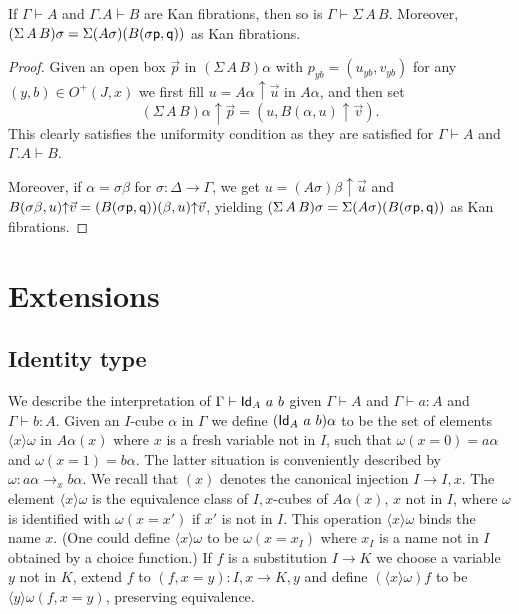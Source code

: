 \documentclass[10pt,a4paper]{article}
\newcommand{\Id}{{\sf Id}}
\newcommand{\pp}{{\sf p}}
\newcommand{\qq}{{\sf q}}
\newcommand{\rup}[1]{#1{\uparrow}}
\newcommand{\bind}[2]{{\langle}#1{\rangle}#2}
\begin{document}
\begin{theorem}
  If $\Gamma \vdash A$ and $\Gamma.A \vdash B$ are Kan fibrations,
  then so is $\Gamma \vdash \Sigma\,A\,B$.  Moreover, $(\Sigma\,A\,B)
  \sigma = \Sigma (A \sigma) (B (\sigma \pp, \qq))$ as Kan fibrations.
\end{theorem}
\begin{proof}
  Given an open box $\vec p$ in $(\Sigma\,A\,B) \alpha$ with
  $p_{yb}=(u_{yb},v_{yb})$ for any $(y,b)\in O^+(J,x)$ we first fill
  $u = \rup {A \alpha} {\vec u}$ in $A \alpha$, and then set
  \[
  \rup{(\Sigma\,A\,B) \alpha} {\vec p} = (u, \rup {B (\alpha, u)}
  {\vec v}).
  \]
  This clearly satisfies the uniformity condition as they are
  satisfied for $\Gamma \vdash A$ and $\Gamma.A \vdash B$.

  Moreover, if $\alpha = \sigma \beta$ for $\sigma \colon \Delta \to
  \Gamma$, we get $u = \rup {(A \sigma) \beta} {\vec u}$ and $\rup {B
    (\sigma \beta, u)} {\vec v} = \rup{(B (\sigma \pp, \qq)) (\beta,
    u)} {\vec v}$, yielding $(\Sigma\,A\,B) \sigma = \Sigma (A \sigma)
  (B (\sigma \pp, \qq))$ as Kan fibrations.
\end{proof}


\section{Extensions}

\subsection{Identity type}
\label{sec:identity-type}

We describe the interpretation of $\Gamma\vdash\Id_A~a~b$ given
$\Gamma\vdash A$ and $\Gamma\vdash a:A$ and $\Gamma\vdash b:A$. Given
an $I$-cube $\alpha$ in $\Gamma$ we define $(\Id_A~a~b)\alpha$ to be
the set of elements $\bind{x}{\omega}$ in $A\alpha(x)$ where $x$ is a
fresh variable not in $I$, such that $\omega(x=0) = a\alpha$ and
$\omega(x=1) = b\alpha$. The latter situation is conveniently
described by $\omega: a\alpha\to_x b\alpha$.  We recall that $(x)$ denotes
the canonical injection $I \to I,x$. The element $\bind{x}{\omega}$ is
the equivalence class of $I,x$-cubes of $A\alpha(x)$, $x$ not in $I$,
where $\omega$ is identified with $\omega(x=x')$ if $x'$ is not in
$I$. This operation $\bind{x}{\omega}$ binds the name $x$.  (One could
define $\bind{x}{\omega}$ to be $\omega(x = x_I)$ where $x_I$ is a
name not in $I$ obtained by a choice function.) If $f$ is a
substitution $I \to K$ we choose a variable $y$ not in $K$, extend $f$
to $(f,x=y): I,x \to K,y$ and define $(\bind{x}{\omega}) f$ to be
$\bind{y}{\omega (f,x=y)}$, preserving equivalence.
\end{document}
